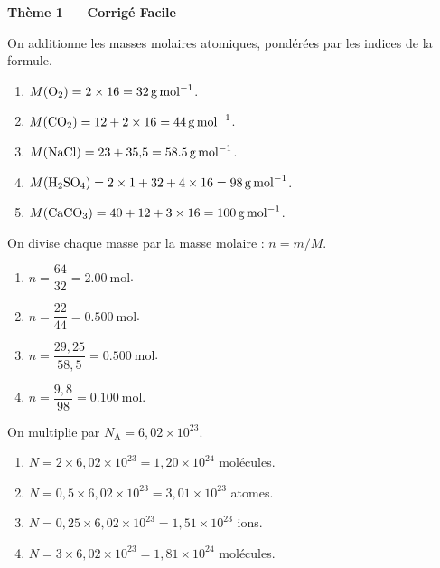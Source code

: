 \documentclass[11pt,a4paper]{article}
\begin{document}
\begin{center}{\large\bfseries\color{primarydark} Thème 1 — Corrigé Facile}\end{center}

\begin{corrige}
On additionne les masses molaires atomiques, pondérées par les indices de la formule.
\begin{enumerate}[label=\alph*)]
  \item $M(\ce{O2}) = 2\times 16 = \SI{32}{\gram\per\mole}$.
  \item $M(\ce{CO2}) = 12 + 2\times 16 = \SI{44}{\gram\per\mole}$.
  \item $M(\ce{NaCl}) = 23 + 35{,}5 = \SI{58.5}{\gram\per\mole}$.
  \item $M(\ce{H2SO4}) = 2\times 1 + 32 + 4\times 16 = \SI{98}{\gram\per\mole}$.
  \item $M(\ce{CaCO3}) = 40 + 12 + 3\times 16 = \SI{100}{\gram\per\mole}$.
\end{enumerate}
\end{corrige}

\begin{corrige}
On divise chaque masse par la masse molaire : $n = m/M$.
\begin{enumerate}[label=\alph*)]
  \item $n = \dfrac{64}{32} = \SI{2.00}{\mole}$.
  \item $n = \dfrac{22}{44} = \SI{0.500}{\mole}$.
  \item $n = \dfrac{29{,}25}{58{,}5} = \SI{0.500}{\mole}$.
  \item $n = \dfrac{9{,}8}{98} = \SI{0.100}{\mole}$.
\end{enumerate}
\end{corrige}

\begin{corrige}
On multiplie par $N_{\mathrm{A}} = 6{,}02\times10^{23}$.
\begin{enumerate}[label=\alph*)]
  \item $N = 2\times 6{,}02\times10^{23} = 1{,}20\times10^{24}$ molécules.
  \item $N = 0{,}5\times 6{,}02\times10^{23} = 3{,}01\times10^{23}$ atomes.
  \item $N = 0{,}25\times 6{,}02\times10^{23} = 1{,}51\times10^{23}$ ions.
  \item $N = 3\times 6{,}02\times10^{23} = 1{,}81\times10^{24}$ molécules.
\end{enumerate}
\end{corrige}
\end{document}
